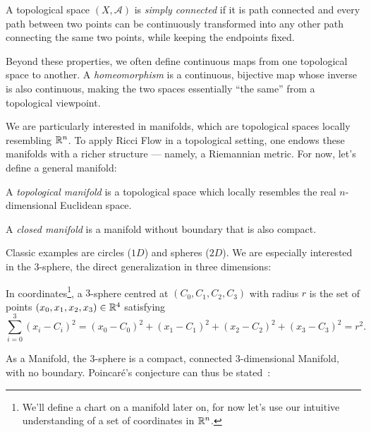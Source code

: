 \begin{definition}
    A topological space $(X,\mathcal{A})$ is \emph{simply connected} if it is path connected and every path between two points can be continuously transformed into any other path connecting the same two points, while keeping the endpoints fixed.
\end{definition}

Beyond these properties, we often define continuous maps from one topological space to another. A \emph{homeomorphism} is a continuous, bijective map whose inverse is also continuous, making the two spaces essentially “the same” from a topological viewpoint.

We are particularly interested in manifolds, which are topological spaces locally resembling $\mathbb{R}^n$. To apply Ricci Flow in a topological setting, one endows these manifolds with a richer structure — namely, a Riemannian metric. For now, let's define a general manifold:

\begin{definition}[Manifold]\label{def:manifold-prev}
    A \emph{topological manifold} is a topological space which locally resembles the real $n$-dimensional Euclidean space.
\end{definition}

\begin{definition}
    A \emph{closed manifold} is a manifold without boundary that is also compact.
\end{definition}

Classic examples are circles ($1D$) and spheres ($2D$). We are especially interested in the $3$-sphere, the direct generalization in three dimensions:

\begin{definition}[$3$-sphere]
    In coordinates\footnote{We'll define a chart on a manifold later on, for now let's use our intuitive understanding of a set of coordinates in $\mathbb{R}^n$.}, a $3$-sphere centred at $(C_0,C_1,C_2,C_3)$ with radius $r$ is the set of points $(x_0,x_1,x_2,x_3) \in \mathbb{R}^4$ satisfying
    \begin{equation}
        \sum_{i=0}^3 (x_i - C_i)^2 = (x_0 - C_0)^2 + (x_1 - C_1)^2 + (x_2 - C_2)^2 + (x_3 - C_3)^2 = r^2.
    \end{equation}
\end{definition}

As a Manifold, the $3$-sphere  is a compact, connected $3$-dimensional Manifold, with no boundary. Poincaré's conjecture can thus be stated~\cite{poincare:analysis-situs}:

